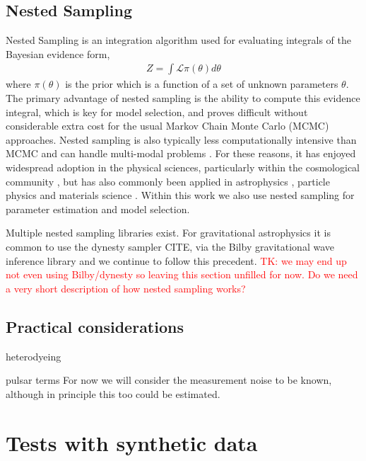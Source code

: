 \documentclass[fleqn,usenatbib,useAMS]{mnras}
\begin{document}
\subsection{Nested Sampling}\label{sec:nested_sampling}
Nested Sampling \citep{Skilling} is an integration algorithm used for evaluating integrals of the Bayesian evidence form,
\begin{eqnarray}
	Z = \int \mathcal{L} \pi (\theta) d \theta
\end{eqnarray}
where $\pi (\theta)$ is the prior which is a function of a set of unknown parameters $\theta$. The primary advantage of nested sampling is the ability to compute this evidence integral, which is key for model selection, and proves difficult without considerable extra cost for the usual Markov Chain Monte Carlo (MCMC) approaches. Nested sampling is also typically less computationally intensive than MCMC and can handle multi-modal problems \citep{Ashton2022}. For these reasons, it has enjoyed widespread adoption in the physical sciences, particularly within the cosmological community \citep{Mukherjee2006,Feroz2008,Handley2015}, but has also commonly been applied in astrophysics \citep{UltraNest2021}, particle physics \citep{proceedings2019033014} and materials science \citep{2009arXiv0906materials}. Within this work we also use nested sampling for parameter estimation and model selection. \newline 


\noindent Multiple nested sampling libraries exist. For gravitational astrophysics it is common to use the dynesty sampler CITE, via the Bilby gravitational wave inference library and we continue to follow this precedent. 
\textcolor{red}{TK: we may end up not even using Bilby/dynesty so leaving this section unfilled for now. Do we need a very short description of how nested sampling works?}

\subsection{Practical considerations}

heterodyeing 

pulsar terms 
For now we will consider the measurement noise to be known, although in principle this too could be estimated. 







\section{Tests with synthetic data} \label{sec:testing}
\end{document}
